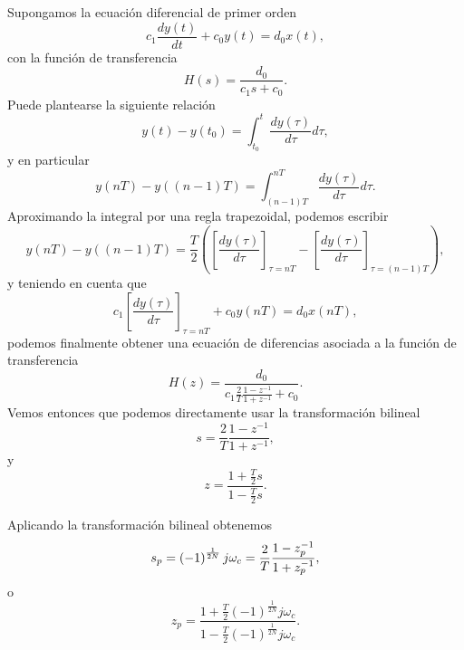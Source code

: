 Supongamos la ecuaci\'{o}n diferencial de primer orden 
\begin{equation}
c_{1}\frac{dy\left( t\right) }{dt}+c_{0}y\left( t\right) =d_{0}x\left(
t\right) ,
\end{equation}
con la funci\'{o}n de transferencia 
\begin{equation}
H\left( s\right) =\frac{d_{0}}{c_{1}s+c_{0}}.
\end{equation}
Puede plantearse la siguiente relaci\'{o}n 
\begin{equation}
y\left( t\right) -y\left( t_{0}\right) =\int_{t_{0}}^{t}\frac{dy\left( \tau
\right) }{d\tau }d\tau ,
\end{equation}
y en particular 
\begin{equation}
y\left( nT\right) -y\left( \left( n-1\right) T\right) =\int_{\left(
n-1\right) T}^{nT}\frac{dy\left( \tau \right) }{d\tau }d\tau .
\end{equation}
Aproximando la integral por una regla trapezoidal, podemos escribir 
\begin{equation}
y\left( nT\right) -y\left( \left( n-1\right) T\right) =\frac{T}{2}\left( %
\left[ \frac{dy\left( \tau \right) }{d\tau }\right] _{\tau =nT}-\left[ 
\frac{dy\left( \tau \right) }{d\tau }\right] _{\tau =\left( n-1\right)
T}\right) ,
\end{equation}
y teniendo en cuenta que 
\begin{equation}
c_{1}\left[ \frac{dy\left( \tau \right) }{d\tau }\right] _{\tau
=nT}+c_{0}y\left( nT\right) =d_{0}x\left( nT\right) ,
\end{equation}
podemos finalmente obtener una ecuaci\'{o}n de diferencias asociada a la funci\'{o}n de transferencia 
\begin{equation}
H\left( z\right) =\frac{d_{0}}{c_{1}\frac{2}{T}\frac{1-z^{-1}}{1+z^{-1}}%
+c_{0}}.
\end{equation}
Vemos entonces que podemos directamente usar la transformaci\'{o}n bilineal 
\begin{equation}
s=\frac{2}{T}\frac{1-z^{-1}}{1+z^{-1}},
\end{equation}
y 
\begin{equation}
z=\frac{1+\frac{T}{2}s}{1-\frac{T}{2}s}.
\end{equation}

Aplicando la transformaci\'{o}n bilineal obtenemos 
\begin{equation}
s_{p}=\left( -1\right) ^{\frac{1}{2N}}j\omega _{c}=\frac{2}{T}\frac{%
1-z_{p}^{-1}}{1+z_{p}^{-1}},
\end{equation}
o 
\begin{equation}
z_{p}=\frac{1+\frac{T}{2}
  \left( -1\right)^{\frac{1}{2N}}j\omega _{c}}{1-\frac{T}{2}\left( -1\right) ^{\frac{1}{2N}}j\omega _{c}}.
\end{equation}

